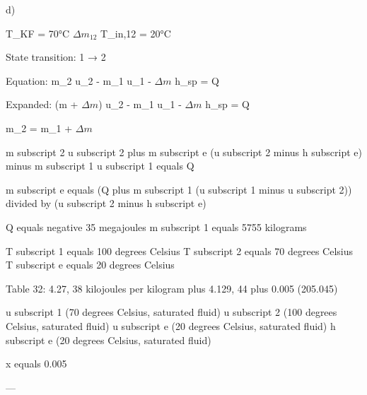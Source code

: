 d)  

T_{KF} = 70°C  
\( \Delta m_{12} \)  
T_{in,12} = 20°C  

State transition: 1 → 2  

Equation:  
m_2 u_2 - m_1 u_1 - \( \Delta m \) h_{sp} = Q  

Expanded:  
(m + \( \Delta m \)) u_2 - m_1 u_1 - \( \Delta m \) h_{sp} = Q  

m_2 = m_1 + \( \Delta m \)

m subscript 2 u subscript 2 plus m subscript e (u subscript 2 minus h subscript e) minus m subscript 1 u subscript 1 equals Q  

m subscript e equals (Q plus m subscript 1 (u subscript 1 minus u subscript 2)) divided by (u subscript 2 minus h subscript e)  

Q equals negative 35 megajoules  
m subscript 1 equals 5755 kilograms  

T subscript 1 equals 100 degrees Celsius  
T subscript 2 equals 70 degrees Celsius  
T subscript e equals 20 degrees Celsius  

Table 32:  
4.27, 38 kilojoules per kilogram plus 4.129, 44 plus 0.005 (205.045)  

u subscript 1 (70 degrees Celsius, saturated fluid)  
u subscript 2 (100 degrees Celsius, saturated fluid)  
u subscript e (20 degrees Celsius, saturated fluid)  
h subscript e (20 degrees Celsius, saturated fluid)  

x equals 0.005  

---